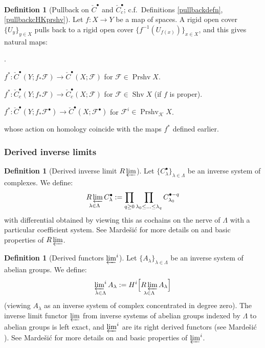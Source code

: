 \documentclass[12pt]{article}
\theoremstyle{definition}
\newtheorem{definition}[theorem]{Definition}
\theoremstyle{remark}
\numberwithin{equation}{subsection}
\newcommand{\F}{\mathcal F}
\newcommand{\K}{\mathcal K}
\newcommand{\cC}{\check C}
\newcommand{\Prshv}{\operatorname{Prshv}}
\newcommand{\Shv}{\operatorname{Shv}}
\newcommand{\Rlim}{\mathop{R\varprojlim}}
\newcounter{rcounti}
\newenvironment{rlist}{\begin{list}{\roman{rcounti}.}{\usecounter{rcounti}
\setlength\itemsep{0pt}
\setlength\labelsep{4pt}
\setlength\labelwidth{16pt}
\setlength\leftmargin{32pt}
\setlength\listparindent{0pt}
\setlength\parsep{0pt}
\setlength\parskip{0pt}
\setlength\partopsep{0pt}
\setlength\rightmargin{0pt}
\setlength\topsep{0pt}
\setlength\itemindent{0pt}
}}{\end{list}}
\begin{document}
\begin{definition}[Pullback on $\cC^\bullet$ and $\cC^\bullet_c$; c.f.\ Definitions \ref{pullbackdefn}, \ref{pullbackcHKprshv}]\label{cechcochainspullback}
Let $f:X\to Y$ be a map of spaces.  A rigid open cover $\{U_y\}_{y\in X}$ pulls back to a rigid open cover $\{f^{-1}(U_{f(x)})\}_{x\in X}$, and this gives natural maps:
\begin{rlist}
\item$f^\ast:\cC^\bullet(Y;f_\ast\F)\to\cC^\bullet(X;\F)$ for $\F\in\Prshv X$.
\item$f^\ast:\cC^\bullet_c(Y;f_\ast\F)\to\cC^\bullet_c(X;\F)$ for $\F\in\Shv X$ (if $f$ is proper).
\item$f^\ast:\cC^\bullet(Y;f_\ast\F^\bullet)\to\cC^\bullet(X;\F^\bullet)$ for $\F^i\in\Prshv_\K X$.
\end{rlist}
whose action on homology coincide with the maps $f^\ast$ defined earlier.
\end{definition}

\subsubsection{Derived inverse limits}

\begin{definition}[Derived inverse limit $\Rlim$]
Let $\{C^\bullet_\lambda\}_{\lambda\in\Lambda}$ be an inverse system of complexes.  We define:
\begin{equation}
\Rlim_{\lambda\in\Lambda}C^\bullet_\lambda:=\prod_{q\geq 0}\prod_{\lambda_0\leq\ldots\leq\lambda_q}C^{\bullet-q}_{\lambda_0}
\end{equation}
with differential obtained by viewing this as cochains on the nerve of $\Lambda$ with a particular coefficient system.  See Marde\v si\'c \cite[\S 17]{mardesic} for more details on and basic properties of $\Rlim$.
\end{definition}

\begin{definition}[Derived functors $\varprojlim^i$]
Let $\{A_\lambda\}_{\lambda\in\Lambda}$ be an inverse system of abelian groups.  We define:
\begin{equation}\label{limidef}
\mathop{\textstyle\varprojlim^i}\limits_{\lambda\in\Lambda}A_\lambda:=H^i\Bigl[\Rlim_{\lambda\in\Lambda}A_\lambda\Bigr]
\end{equation}
(viewing $A_\lambda$ as an inverse system of complex concentrated in degree zero).  The inverse limit functor $\varprojlim$ from inverse systems of abelian groups indexed by $\Lambda$ to abelian groups is left exact, and $\varprojlim^i$ are its right derived functors (see Marde\v si\'c \cite[Corollary 11.47]{mardesic}).  See Marde\v si\'c \cite[\S\S 11--15]{mardesic} for more details on and basic properties of $\varprojlim^i$.
\end{definition}
\end{document}
